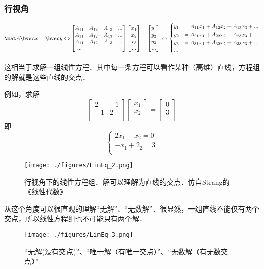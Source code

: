 \subsubsection{行视角}
$$
\mat A \bvec x=\bvec y \Leftrightarrow 
\begin{bmatrix}
A_{11}&A_{12}&A_{13}&...\\
A_{11}&A_{12}&A_{13}&...\\
A_{11}&A_{12}&A_{13}&...\\
...
\end{bmatrix}
\begin{bmatrix}
x_{1}\\
x_{2}\\
x_{3}\\
...\\
\end{bmatrix}
=
\begin{bmatrix}
y_{1}\\
y_{2}\\
y_{3}\\
...\\
\end{bmatrix}
\Leftrightarrow 
\begin{cases}
y_1&=A_{11}x_1+A_{12}x_2+A_{13}x_3+...\\
y_2&=A_{21}x_1+A_{22}x_2+A_{23}x_3+...\\
y_3&=A_{31}x_1+A_{32}x_2+A_{33}x_3+...\\
...&\\
\end{cases}
$$

这相当于求解一组线性方程．其中每一条方程可以看作某种（高维）直线，方程组的解就是这些直线的交点．

\begin{example}{}
例如，求解
$$
\begin{bmatrix}
2&-1\\
-1&2\\
\end{bmatrix}
\begin{bmatrix}
x_1\\
x_2\\
\end{bmatrix}
=
\begin{bmatrix}
0\\
3\\
\end{bmatrix}
$$
即
$$
\begin{cases}
2x_1-x_2=0\\
-x_1+2_2=3\\
\end{cases}
$$
\begin{figure}[ht]
\centering
\texttt{[image: ./figures/LinEq\_2.png]}
\caption{行视角下的线性方程组．解可以理解为直线的交点．仿自Strang的《线性代数》} \label{LinEq_fig2}
\end{figure}
\end{example}
从这个角度可以很直观的理解“无解”、“无数解”．很显然，一组直线不能仅有两个交点，所以线性方程组也不可能只有两个解．
\begin{figure}[ht]
\centering
\texttt{[image: ./figures/LinEq\_3.png]}
\caption{“无解(没有交点)”、“唯一解（有唯一交点）”、“无数解（有无数交点）”} \label{LinEq_fig3}
\end{figure}

